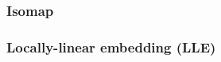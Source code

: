\documentclass[journal, a4paper]{IEEEtran}
\begin{document}


\subsubsection{Isomap}

%


\subsubsection{Locally-linear embedding (LLE)}
\end{document}
